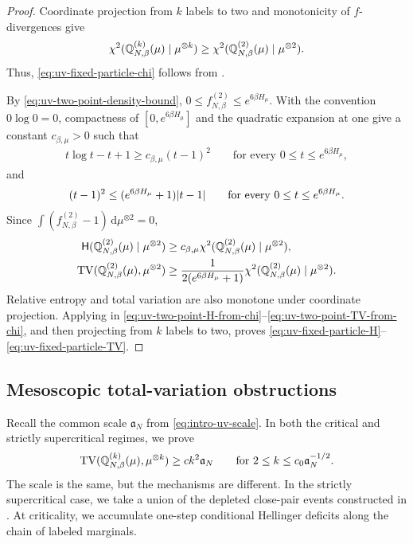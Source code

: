 \documentclass[11pt,reqno]{amsart}
\numberwithin{equation}{section}
\theoremstyle{plain}
\theoremstyle{remark}
\DeclarePairedDelimiter{\pa}{\lparen}{\rparen}
\DeclarePairedDelimiter{\abs}{\lvert}{\rvert}
\newcommand{\md}{\mathrm{d}}
\newcommand{\Q}{{\mathbb{Q}}}
\newcommand{\Hr}{{\mathsf{H}}}
\newcommand{\be}{\beta}
\newcommand{\Chi}{\chi^2}
\newcommand{\TV}{\operatorname{TV}}
\begin{document}
\begin{proof}
Coordinate projection from \(k\) labels to two and monotonicity of \(f\)-divergences give
\begin{align}\label{eq:uv-chi-projection-monotonicity}
 \Chi\pa{\Q_{N,\be}^{(k)}(\mu)\mid\mu^{\otimes k}}
 \ge
 \Chi\pa{\Q_{N,\be}^{(2)}(\mu)\mid\mu^{\otimes2}}.
\end{align}
Thus, \eqref{eq:uv-fixed-particle-chi} follows from .

By \eqref{eq:uv-two-point-density-bound}, \(0\le f_{N,\be}^{(2)}\le e^{6\be H_\mu}\).  With the convention \(0\log0=0\), compactness of \([0,e^{6\be H_\mu}]\) and the quadratic expansion at one give a constant \(c_{\be,\mu}>0\) such that
\begin{align}\label{eq:uv-entropy-chi-comparison}
 t\log t-t+1\ge c_{\be,\mu}(t-1)^2
 \qquad\text{for every \(0\le t\le e^{6\be H_\mu}\)},
\end{align}
and
\begin{align}\label{eq:uv-TV-chi-comparison}
 (t-1)^2\le(e^{6\be H_\mu}+1)\abs{t-1}
 \qquad\text{for every \(0\le t\le e^{6\be H_\mu}\)}.
\end{align}
Since \(\int(f_{N,\be}^{(2)}-1)\,\md\mu^{\otimes2}=0\),
\begin{align}
 \Hr\pa{\Q_{N,\be}^{(2)}(\mu)\mid\mu^{\otimes2}}
 &\ge c_{\be,\mu}
 \Chi\pa{\Q_{N,\be}^{(2)}(\mu)\mid\mu^{\otimes2}},
 \label{eq:uv-two-point-H-from-chi}\\
 \TV\pa{\Q_{N,\be}^{(2)}(\mu),\mu^{\otimes2}}
 &\ge\frac1{2(e^{6\be H_\mu}+1)}
 \Chi\pa{\Q_{N,\be}^{(2)}(\mu)\mid\mu^{\otimes2}}.
 \label{eq:uv-two-point-TV-from-chi}
\end{align}
Relative entropy and total variation are also monotone under coordinate projection.  Applying  in \eqref{eq:uv-two-point-H-from-chi}--\eqref{eq:uv-two-point-TV-from-chi}, and then projecting from \(k\) labels to two, proves \eqref{eq:uv-fixed-particle-H}--\eqref{eq:uv-fixed-particle-TV}.
\end{proof}

\subsection{Mesoscopic total-variation obstructions}
\label{subsec:uv-mesoscopic}

Recall the common scale \(\mathfrak a_N\) from \eqref{eq:intro-uv-scale}.  In both the critical and strictly supercritical regimes, we prove
\begin{align}\label{eq:uv-mesoscopic-common-form}
 \TV\pa{\Q_{N,\be}^{(k)}(\mu),\mu^{\otimes k}}
 \ge c k^2\mathfrak a_N
 \qquad\text{for \(2\le k\le c_0\mathfrak a_N^{-1/2}\)}.
\end{align}
The scale is the same, but the mechanisms are different.  In the strictly supercritical case, we take a union of the depleted close-pair events constructed in .  At criticality, we accumulate one-step conditional Hellinger deficits along the chain of labeled marginals.
\end{document}
